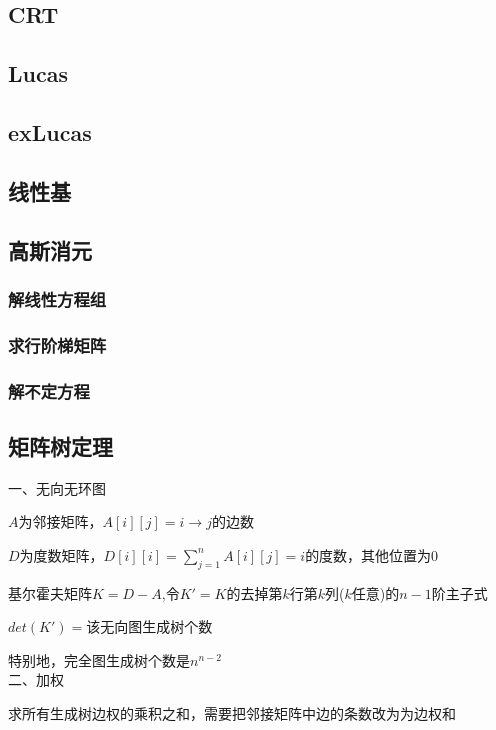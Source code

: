 \documentclass[a4paper]{article}
\begin{document}
\subsection{CRT}

\subsection{Lucas}

\subsection{exLucas}

\subsection{线性基}

\subsection{高斯消元}
\subsubsection{解线性方程组}

\subsubsection{求行阶梯矩阵}

\subsubsection{解不定方程}

\subsection{矩阵树定理}


一、无向无环图

$A$为邻接矩阵，$A[i][j]=i\to j$的边数

$D$为度数矩阵，$D[i][i]=\sum\limits_{j=1}^n A[i][j]=i$的度数，其他位置为0

基尔霍夫矩阵$K=D-A$,令$K'=K$的去掉第$k$行第$k$列($k$任意)的$n-1$阶主子式

$det(K')=$该无向图生成树个数

特别地，完全图生成树个数是$n^{n-2}$\\

二、加权

求所有生成树边权的乘积之和，需要把邻接矩阵中边的条数改为为边权和
\end{document}
